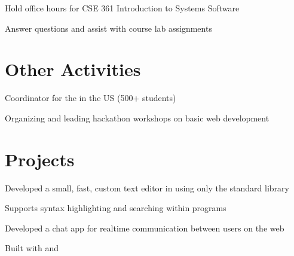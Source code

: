 \documentclass[]{deedy-resume-openfont}
\begin{document}
\begin{minipage}[t]{0.66\textwidth}
\begin{tightemize}
\item Hold office hours for CSE 361 Introduction to Systems Software
\item Answer questions and assist with course lab assignments
\end{tightemize}
\sectionsep


\section{Other Activities}

\begin{tightemize}
\item Coordinator for the  in the US (500+ students)
\item Organizing and leading hackathon workshops on basic web development
\end{tightemize}
\sectionsep


\section{Projects}
\descript{}
\begin{tightemize}
\item Developed a small, fast, custom text editor in  using only the standard library
\item Supports syntax highlighting and searching within programs
\end{tightemize}
\sectionsep

\descript{}
\begin{tightemize}
\item Developed a chat app for realtime communication between users on the web
\item Built with  and 
\end{tightemize}
\sectionsep


\end{minipage}
\end{document}
